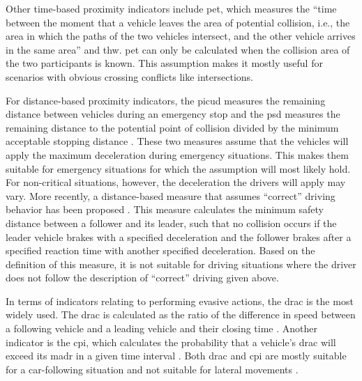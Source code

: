 Other time-based proximity indicators include \ac{pet}, which measures the ``time between the moment that a vehicle leaves the area of potential collision, i.e., the area in which the paths of the two vehicles intersect, and the other vehicle arrives in the same area'' \autocite{mahmud2017application} and \ac{thw}.
\cstartb \ac{pet} can only be calculated when the collision area of the two participants is known. 
This assumption makes it mostly useful for scenarios with obvious crossing conflicts like intersections. \cendb

For distance-based proximity indicators, the \ac{picud} measures the remaining distance between vehicles during an emergency stop \autocite{iida2001traffic, uno2003objective} and the \ac{psd} measures the remaining distance to the potential point of collision divided by the minimum acceptable stopping distance \autocite{allen1978analysis, guido2011comparing, mahmud2017application}. 
\cstartb These two measures assume that the vehicles will apply the maximum deceleration during emergency situations. 
This makes them suitable for emergency situations for which the assumption will most likely hold. 
For non-critical situations, however, the deceleration the drivers will apply may vary. \cendb
More recently, a distance-based measure that assumes ``correct'' driving behavior has been proposed \autocite{shalev2017formal}. 
This measure calculates the minimum safety distance between a follower and its leader, such that no collision occurs if the leader vehicle brakes with a specified deceleration and the follower brakes after a specified reaction time with another specified deceleration. 
\cstartb Based on the definition of this measure, it is not suitable for driving situations where the driver does not follow the description of ``correct'' driving given above. \cendb

In terms of indicators relating to performing evasive actions, the \ac{drac} is the most widely used. 
The \ac{drac} is calculated as the ratio of the difference in speed between a following vehicle and a leading vehicle and their closing time \autocite{almqvist1991use, mahmud2017application}. 
Another indicator is the \ac{cpi}, which calculates the probability that a vehicle's \ac{drac} will exceed its \ac{madr} in a given time interval \autocite{cunto2009simulated}. 
\cstartb Both \ac{drac} and \ac{cpi} are mostly suitable for a car-following situation and not suitable for lateral movements \autocite{mahmud2017application}. \cendb


